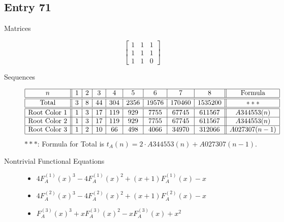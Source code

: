 \documentclass[12pt]{amsart}
\newcommand{\gff}[2]{F_{#2}^{(#1)}(x)}
\newcommand{\gfa}[1]{\gff{#1}{A}}
\begin{document}
\subsection*{Entry 71}
\begin{description}
    \item[Matrices]
    
    \[\begin{bmatrix}
1 & 1 & 1 \\
1 & 1 & 1 \\
1 & 1 & 0
\end{bmatrix}\]
    \item[Sequences]\hspace*{\fill}\vspace{-0.5cm}
    \begin{center}
        \[
        \begin{array}{|c||c|c|c|c|c|c|c|c||c|}\hline
           n  & 1 & 2 & 3 & 4 & 5 & 6 & 7 & 8  & \text{Formula}\\\hline\hline
           \text{Total}  & 3 & 8 & 44 & 304 & 2356 & 19576 & 170460 & 1535200 & ***\\\hline\hline
           \text{Root Color }1 & 1 & 3 & 17 & 119 & 929 & 7755 & 67745 & 611567 & A344553(n)\\\hline
           \text{Root Color }2 & 1 & 3 & 17 & 119 & 929 & 7755 & 67745 & 611567 & A344553(n)\\\hline
           \text{Root Color }3 & 1 & 2 & 10 & 66 & 498 & 4066 & 34970 & 312066 & A027307(n-1)\\\hline
        \end{array}
        \]
        $***$: Formula for Total is $t_A(n)=2\cdot A344553(n) + A027307(n-1)$.
    \end{center}
    
    \item[Nontrivial Functional Equations]\hspace*{\fill}

    \begin{itemize}
\item $4\gfa{1}^3-4\gfa{1}^2+(x + 1)\gfa{1}-x$


\item $4\gfa{2}^3-4\gfa{2}^2+(x + 1)\gfa{2}-x$


\item $\gfa{3}^3+x\gfa{3}^2-x\gfa{3}+x^2$


\end{itemize}
\end{description}
\end{document}

